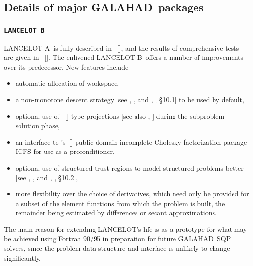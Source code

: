 \documentclass[acmtocl,acmnow]{acmtrans2m}
\newcommand{\gal}{{\sf GALAHAD}}
\newcommand{\lan}{{\sf LANCELOT}}
\newcommand{\lana}{{\sf LANCELOT A}}
\newcommand{\lanb}{{\sf LANCELOT B}}
\newcommand{\citebb}[1]{\citeauthor{#1}\ [\citeyear{#1}]}
\newcommand{\citebbs}[1]{\citeauthor{#1}'s\ [\citeyear{#1}]}
\newcommand{\bciteb}[1]{\citeauthor{#1}, \citeyear{#1}}
\begin{document}
\subsection{Details of major \gal\ packages\label{major}}

\subsubsection{{\tt LANCELOT B}\label{lanb}}

\lana\ is fully described in \citebb{ConnGoulToin92}, and the results
of comprehensive tests are given in \citebb{ConnGoulToin96a}.
The enlivened \lanb\ offers a number of improvements over its predecessor.
New features include
\begin{itemize}
\item automatic allocation of workspace,
\item a non-monotone descent strategy [see \bciteb{Toin96b}, and 
\bciteb{ConnGoulToin00}, \S10.1] to be used by default,
\item optional use of \citebb{MoreTora91}-type projections 
   [see also \bciteb{LinMore99b}] 
   during the subproblem solution phase,
\item an interface to \citebbs{LinMore99} public domain incomplete Cholesky 
   factorization package ICFS for use as a preconditioner,
\item optional use of structured trust regions to model 
   structured problems better [see \bciteb{ConnGoulSartToin96a}, and
   \bciteb{ConnGoulToin00}, \S10.2],
\item more flexibility over the choice of derivatives, which need
   only be provided for a subset of the element functions from which the 
   problem is built, the remainder being estimated by differences or secant 
   approximations.  
\end{itemize}
The main reason for extending \lan's life is as a prototype
for what may be achieved using Fortran 90/95 in preparation for 
future \gal\ SQP solvers, since the problem data structure and
interface is unlikely to change significantly.
\end{document}
